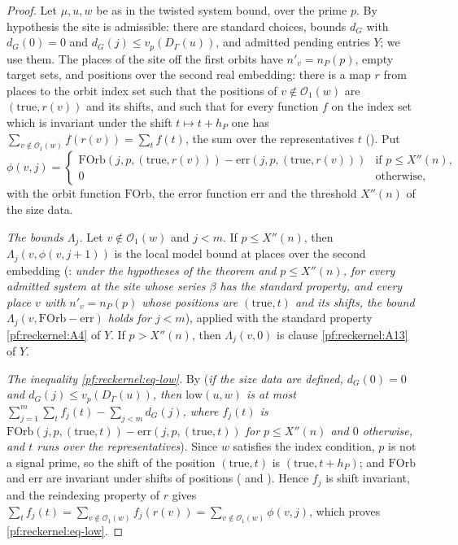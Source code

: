 \begin{proof}
Let $\mu,u,w$ be as in the twisted system bound, over the prime $p$. By hypothesis the site is admissible: there are
standard choices, bounds $d_G$ with $d_G(0)=0$ and $d_G(j)\le v_p(D_\Gamma(u))$, and admitted pending entries $Y$; we use
them. The places of the site off the first orbits have $n'_v=n_P(p)$, empty target sets, and positions over the second
real embedding: there is a map $r$ from places to the orbit index set such that the positions of $v\notin\mathcal O_1(w)$
are $(\mathrm{true},r(v))$ and its shifts, and such that for every function $f$ on the index set which is invariant under
the shift $t\mapsto t+h_P$ one has $\sum_{v\notin\mathcal O_1(w)}f(r(v))=\sum_{t}f(t)$, the sum over the representatives $t$
(). Put
\[
\phi(v,j)=\begin{cases}\mathrm{FOrb}(j,p,(\mathrm{true},r(v)))-\mathrm{err}(j,p,(\mathrm{true},r(v)))&\text{if }p\le X''(n),\\
0&\text{otherwise},\end{cases}
\]
with the orbit function $\mathrm{FOrb}$, the error function $\mathrm{err}$ and the threshold $X''(n)$ of the size data.

\emph{The bounds $\Lambda_j$.} Let $v\notin\mathcal O_1(w)$ and $j<m$. If $p\le X''(n)$, then
$\Lambda_j(v,\phi(v,j+1))$ is the local model bound at places over the second embedding
(: \emph{under the hypotheses of the theorem and
$p\le X''(n)$, for every admitted system at the site whose series $\beta$ has the standard property, and every place $v$ with
$n'_v=n_P(p)$ whose positions are $(\mathrm{true},t)$ and its shifts, the bound $\Lambda_j(v,\mathrm{FOrb}-\mathrm{err})$ holds
for $j<m$}), applied with the standard property \ref{pf:reckernel:A4} of $Y$. If $p>X''(n)$, then $\Lambda_j(v,0)$ is
clause \ref{pf:reckernel:A13} of $Y$.

\emph{The inequality \eqref{pf:reckernel:eq-low}.} By 
(\emph{if the size data are defined, $d_G(0)=0$ and $d_G(j)\le v_p(D_\Gamma(u))$, then $\mathrm{low}(u,w)$ is at most
$\sum_{j=1}^m\sum_tf_j(t)-\sum_{j<m}d_G(j)$, where $f_j(t)$ is $\mathrm{FOrb}(j,p,(\mathrm{true},t))-\mathrm{err}(j,p,(\mathrm{true},t))$
for $p\le X''(n)$ and $0$ otherwise, and $t$ runs over the representatives}). Since $w$ satisfies the index condition, $p$ is
not a signal prime, so the shift of the position $(\mathrm{true},t)$ is $(\mathrm{true},t+h_P)$; and $\mathrm{FOrb}$ and $\mathrm{err}$ are
invariant under shifts of positions ( and ).
Hence $f_j$ is shift invariant, and the reindexing property of $r$ gives
$\sum_tf_j(t)=\sum_{v\notin\mathcal O_1(w)}f_j(r(v))=\sum_{v\notin\mathcal O_1(w)}\phi(v,j)$, which proves
\eqref{pf:reckernel:eq-low}.
\end{proof}

